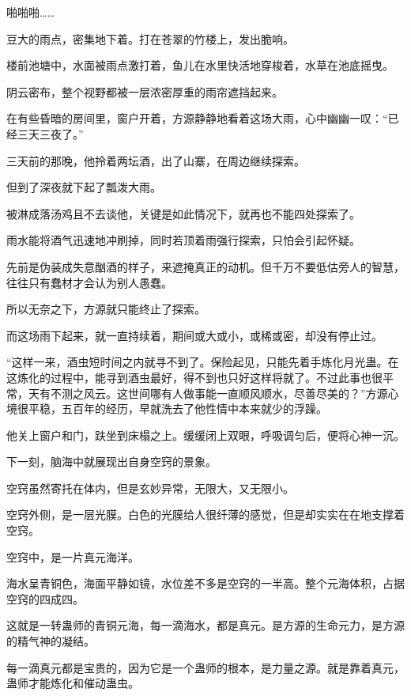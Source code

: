 
\begin{this_body}

啪啪啪……

豆大的雨点，密集地下着。打在苍翠的竹楼上，发出脆响。

楼前池塘中，水面被雨点激打着，鱼儿在水里快活地穿梭着，水草在池底摇曳。

阴云密布，整个视野都被一层浓密厚重的雨帘遮挡起来。

在有些昏暗的房间里，窗户开着，方源静静地看着这场大雨，心中幽幽一叹：“已经三天三夜了。”

三天前的那晚，他拎着两坛酒，出了山寨，在周边继续探索。

但到了深夜就下起了瓢泼大雨。

被淋成落汤鸡且不去谈他，关键是如此情况下，就再也不能四处探索了。

雨水能将酒气迅速地冲刷掉，同时若顶着雨强行探索，只怕会引起怀疑。

先前是伪装成失意酗酒的样子，来遮掩真正的动机。但千万不要低估旁人的智慧，往往只有蠢材才会认为别人愚蠢。

所以无奈之下，方源就只能终止了探索。

而这场雨下起来，就一直持续着，期间或大或小，或稀或密，却没有停止过。

“这样一来，酒虫短时间之内就寻不到了。保险起见，只能先着手炼化月光蛊。在这炼化的过程中，能寻到酒虫最好，得不到也只好这样将就了。不过此事也很平常，天有不测之风云。这世间哪有人做事能一直顺风顺水，尽善尽美的？”方源心境很平稳，五百年的经历，早就洗去了他性情中本来就少的浮躁。

他关上窗户和门，趺坐到床榻之上。缓缓闭上双眼，呼吸调匀后，便将心神一沉。

下一刻，脑海中就展现出自身空窍的景象。

空窍虽然寄托在体内，但是玄妙异常，无限大，又无限小。

空窍外侧，是一层光膜。白色的光膜给人很纤薄的感觉，但是却实实在在地支撑着空窍。

空窍中，是一片真元海洋。

海水呈青铜色，海面平静如镜，水位差不多是空窍的一半高。整个元海体积，占据空窍的四成四。

这就是一转蛊师的青铜元海，每一滴海水，都是真元。是方源的生命元力，是方源的精气神的凝结。

每一滴真元都是宝贵的，因为它是一个蛊师的根本，是力量之源。就是靠着真元，蛊师才能炼化和催动蛊虫。


\end{this_body}
